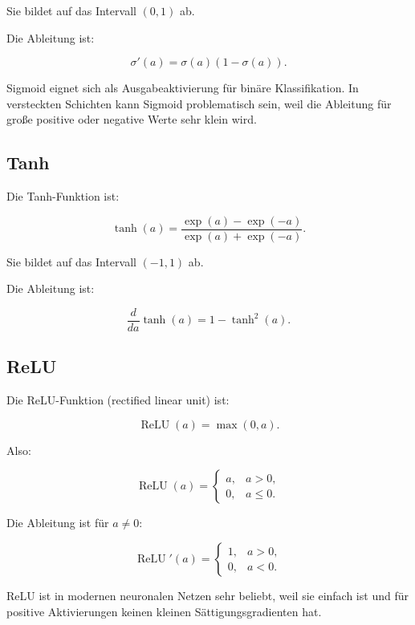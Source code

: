 Sie bildet auf das Intervall \((0,1)\) ab.

Die Ableitung ist:

\[
    \sigma'(a)
    =
    \sigma(a)(1-\sigma(a)).
\]

\begin{notebox}
Sigmoid eignet sich als Ausgabeaktivierung für binäre Klassifikation.
In versteckten Schichten kann Sigmoid problematisch sein, weil die Ableitung für große positive oder negative Werte sehr klein wird.
\end{notebox}

\subsection{Tanh}

Die Tanh-Funktion ist:

\[
    \tanh(a)
    =
    \frac{\exp(a)-\exp(-a)}
    {\exp(a)+\exp(-a)}.
\]

Sie bildet auf das Intervall \((-1,1)\) ab.

Die Ableitung ist:

\[
    \frac{d}{da}\tanh(a)
    =
    1-\tanh^2(a).
\]

\subsection{ReLU}

Die ReLU-Funktion (rectified linear unit) ist:

\[
    \operatorname{ReLU}(a)
    =
    \max(0,a).
\]

Also:

\[
    \operatorname{ReLU}(a)
    =
    \begin{cases}
        a, & a>0, \\
        0, & a\leq 0.
    \end{cases}
\]

Die Ableitung ist für \(a\neq 0\):

\[
    \operatorname{ReLU}'(a)
    =
    \begin{cases}
        1, & a>0, \\
        0, & a<0.
    \end{cases}
\]

\begin{conceptbox}
ReLU ist in modernen neuronalen Netzen sehr beliebt, weil sie einfach ist und für positive Aktivierungen keinen kleinen Sättigungsgradienten hat.
\end{conceptbox}

